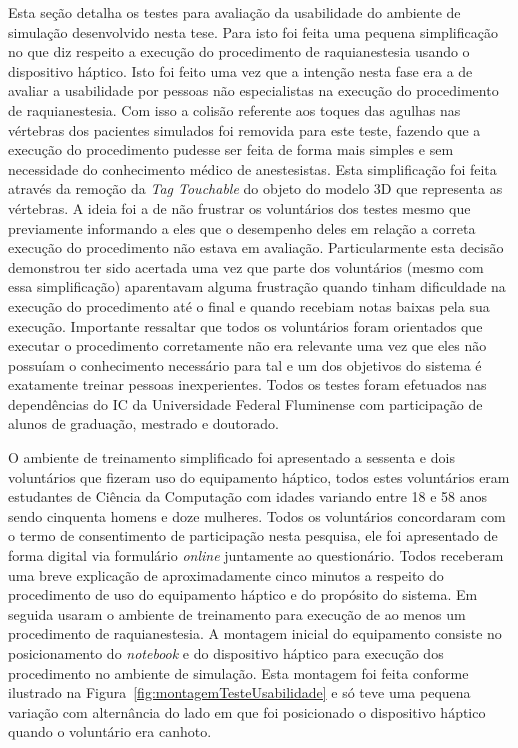 Esta seção detalha os testes para avaliação da usabilidade do ambiente de simulação desenvolvido nesta tese. Para isto foi feita uma pequena simplificação no que diz respeito a execução do procedimento de raquianestesia usando o dispositivo háptico. Isto foi feito uma vez que a intenção nesta fase era a de avaliar a usabilidade por pessoas não especialistas na execução do procedimento de raquianestesia. Com isso a colisão referente aos toques das agulhas nas vértebras dos pacientes simulados foi removida para este teste, fazendo que a execução do procedimento pudesse ser feita de forma mais simples e sem necessidade do conhecimento médico de anestesistas. Esta simplificação foi feita através da remoção da \textit{Tag Touchable} do objeto do modelo 3D que representa as vértebras. 
A ideia foi a de não frustrar os voluntários dos testes mesmo que previamente informando a eles que o desempenho deles em relação a correta execução do procedimento não estava em avaliação. Particularmente esta decisão  demonstrou ter sido acertada uma vez que parte dos voluntários (mesmo com essa simplificação) aparentavam alguma frustração quando tinham dificuldade na execução do procedimento até o final e quando recebiam notas baixas pela sua execução. Importante ressaltar que todos os voluntários foram orientados que executar o procedimento corretamente não era relevante uma vez que eles não possuíam o conhecimento necessário para tal e um dos objetivos do sistema é exatamente treinar pessoas inexperientes. Todos os testes foram efetuados nas dependências do IC da Universidade Federal Fluminense com participação de alunos de graduação, mestrado e doutorado.

O ambiente de treinamento simplificado foi apresentado a sessenta e dois voluntários que fizeram uso do equipamento háptico, todos estes voluntários eram estudantes de Ciência da Computação com idades variando entre 18 e 58 anos sendo cinquenta homens e doze mulheres. Todos os voluntários concordaram com o termo de consentimento de participação nesta pesquisa, ele foi apresentado de forma digital via formulário \textit{online} juntamente ao questionário. Todos receberam uma breve explicação de aproximadamente cinco minutos a respeito do procedimento de uso do equipamento háptico e do propósito do sistema. Em seguida usaram o ambiente de treinamento para execução de ao menos um procedimento de raquianestesia. A montagem inicial do equipamento consiste no posicionamento do \textit{notebook} e do dispositivo háptico para execução dos procedimento no ambiente de simulação. Esta montagem foi feita conforme ilustrado na Figura~\ref{fig:montagemTesteUsabilidade} e só teve uma pequena variação com alternância do lado em que foi posicionado o dispositivo háptico quando o voluntário era canhoto.

